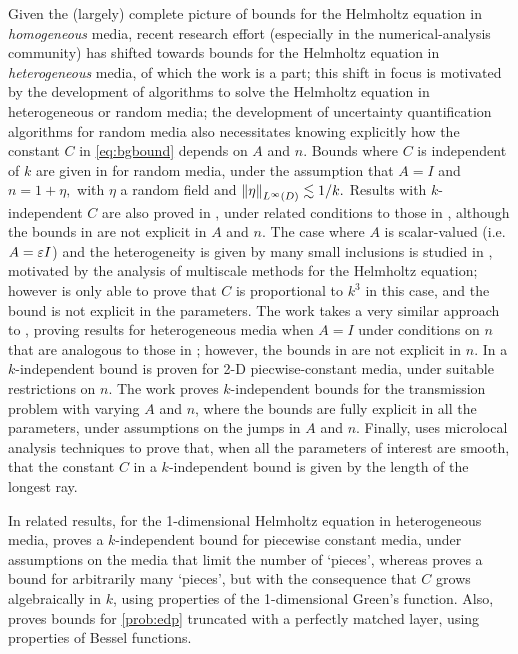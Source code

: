Given the (largely) complete picture of bounds for the Helmholtz equation in \emph{homogeneous} media, recent research effort (especially in the numerical-analysis community) has shifted towards bounds for the Helmholtz equation in \emph{heterogeneous} media, of which the work \cite{GrPeSp:19} is a part; this shift in focus is motivated by the development of algorithms to solve the Helmholtz equation in heterogeneous or random media; the development of uncertainty quantification algorithms for random media also necessitates knowing explicitly how the constant $C$ in \eqref{eq:bgbound} depends on $A$ and $n$. Bounds where $C$ is independent of $k$ are given in \cite{FeLiLo:15} for random media, under the assumption that $A=I$ and $n = 1 + \eta,$ with $\eta$ a random field and $\NLiD{\eta} \lesssim 1/k.$ Results with $k$-independent $C$ are also proved in \cite{BrGaPe:17}, under related conditions to those in \cite{GrPeSp:19}, although the bounds in \cite{GrGaPe:17} are not explicit in $A$ and $n$. The case where $A$ is scalar-valued (i.e. $A = \varepsilon I$) and the heterogeneity is given by many small inclusions is studied in \cite{OhVe:18}, motivated by the analysis of multiscale methods for the Helmholtz equation; however \cite{OhVe:18} is only able to prove that $C$ is proportional to $k^3$ in this case, and the bound is not explicit in the parameters. The work \cite{GrSa:18} takes a very similar approach to \cite{GrPeSp:19}, proving results for heterogeneous media when $A=I$ under conditions on $n$ that are analogous to those in \cite{GrPeSp:19}; however, the bounds in \cite{GrSa:18} are not explicit in $n.$ In \cite{BaChGo:17} a $k$-independent bound is proven for 2-D piecwise-constant media, under suitable restrictions on $n.$ The work \cite{MoSp:19} proves $k$-independent bounds for the transmission problem with varying $A$ and $n$, where the bounds are fully explicit in all the parameters, under assumptions on the jumps in $A$ and $n.$ Finally, \cite{GaSpWu:18} uses microlocal analysis techniques to prove that, when all the parameters of interest are smooth, that the constant $C$ in a $k$-independent bound is given by the length of the longest ray.

In related results, for the 1-dimensional Helmholtz equation in heterogeneous media, \cite{Ch:15} proves a $k$-independent bound for piecewise constant media, under assumptions on the media that limit the number of `pieces', whereas \cite{SaTo:18} proves a bound for arbitrarily many `pieces', but with the consequence that $C$ grows algebraically in $k$, using properties of the 1-dimensional Green's function. Also, \cite{LiWu:18} proves bounds for \cref{prob:edp} truncated with a perfectly matched layer, using properties of Bessel functions.

